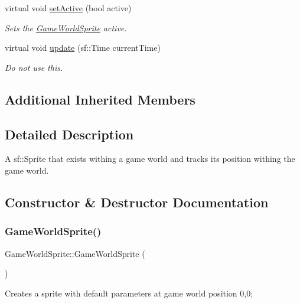 \begin{DoxyCompactItemize}
virtual void \hyperlink{class_game_world_sprite_a4b8597b947076f847d20c66be7db8847}{set\+Active} (bool active)
\begin{DoxyCompactList}\small\item\em Sets the \hyperlink{class_game_world_sprite}{Game\+World\+Sprite} active. \end{DoxyCompactList}\item 
virtual void \hyperlink{class_game_world_sprite_a533f3986452ad2859729d27cc09a5e53}{update} (sf\+::\+Time current\+Time)
\begin{DoxyCompactList}\small\item\em Do not use this. \end{DoxyCompactList}\end{DoxyCompactItemize}
\subsection*{Additional Inherited Members}


\subsection{Detailed Description}
A sf\+::\+Sprite that exists withing a game world and tracks its position withing the game world. 



\subsection{Constructor \& Destructor Documentation}
\mbox{\label{class_game_world_sprite_abab91a4f2d92e1a1719a0a43d21ed62b}} 
\subsubsection{\texorpdfstring{Game\+World\+Sprite()}{GameWorldSprite()}\hspace{0.1cm}{\footnotesize\ttfamily [1/3]}}
{\footnotesize\ttfamily Game\+World\+Sprite\+::\+Game\+World\+Sprite (\begin{DoxyParamCaption}{ }\end{DoxyParamCaption})}



Creates a sprite with default parameters at game world position 0,0; 

